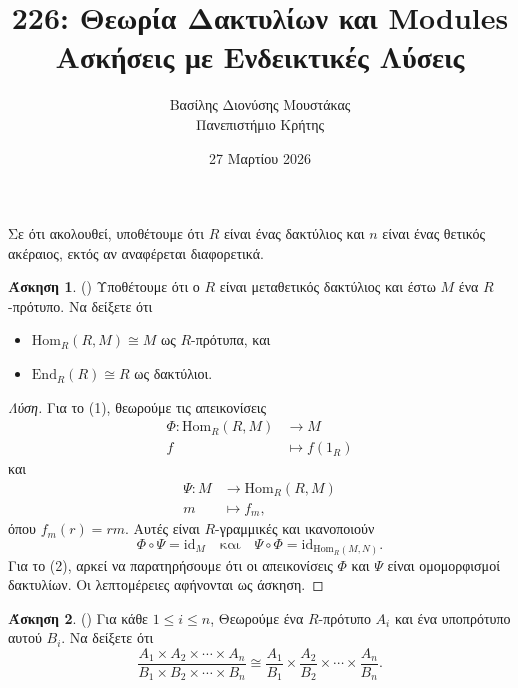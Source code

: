 \documentclass[12pt,a4paper,reqno]{amsart}
\title{226: Θεωρία Δακτυλίων και Modules \\ Ασκήσεις με Ενδεικτικές Λύσεις}
\author[Β.~Δ. Μουστακας]{Βασίλης Διονύσης Μουστάκας \\ Πανεπιστήμιο Κρήτης}
\date{27 Μαρτίου 2026}
\theoremstyle{definition}
\newtheorem{exercise}{Άσκηση}
\renewcommand{\to}{\rightarrow}
\newcommand{\End}{\mathrm{End}}
\newcommand{\rmid}{\mathrm{id}}
\newcommand{\Hom}{\mathrm{Hom}}
\begin{document}
\begingroup
\def\uppercasenonmath#1{} %
\let\MakeUppercase\relax %
\maketitle
\endgroup

\setcounter{exercise}{19}
\setcounter{equation}{3}
\renewcommand{\thesubsection}{\thesection.\arabic{subsection}}

Σε ότι ακολουθεί, υποθέτουμε ότι $R$ είναι ένας δακτύλιος και $n$ είναι ένας θετικός ακέραιος, εκτός αν αναφέρεται διαφορετικά.

\begin{exercise}{\rm(\cite[Ασκήσεις~10.2.9~και~10.2.10]{DF04})}
  \label{ex:DF_10.2.9_10.2.10}
  Υποθέτουμε ότι ο $R$ είναι μεταθετικός δακτύλιος και έστω $M$ ένα $R$-πρότυπο. Να δείξετε ότι 
  \begin{itemize}
    \item[(1)] $\Hom_R(R,M) \cong M$ ως $R$-πρότυπα, και 
    \item[(2)] $\End_R(R) \cong R$ ως δακτύλιοι.
  \end{itemize}
\end{exercise}

\begin{proof}[Λύση]
  Για το (1), θεωρούμε τις απεικονίσεις
  \begin{align*}
    \Phi : \Hom_R(R,M) &\to M \\
    f &\mapsto f(1_R)
  \end{align*}
  και
  \begin{align*}
    \Psi : M &\to \Hom_R(R,M) \\
            m &\mapsto f_m,
  \end{align*}
  όπου $f_m(r) = rm$. Αυτές είναι $R$-γραμμικές και ικανοποιούν 
  \[
  \Phi \circ \Psi = \rmid_M \quad \text{και} \quad 
  \Psi \circ \Phi = \rmid_{\Hom_R(M,N)}.
  \]
  Για το (2), αρκεί να παρατηρήσουμε ότι οι απεικονίσεις $\Phi$ και $\Psi$ είναι ομομορφισμοί δακτυλίων. Οι λεπτομέρειες αφήνονται ως άσκηση.
\end{proof}

\begin{exercise}{\rm(\cite[Άσκηση~10.2.11]{DF04})}
  \label{ex:DF_10.2.11}
  Για κάθε $1 \le i \le n$, Θεωρούμε ένα $R$-πρότυπο $A_i$ και ένα υποπρότυπο αυτού $B_i$. Να δείξετε ότι 
  \[
  \frac{A_1\times A_2 \times \cdots \times A_n}{B_1 \times B_2 \times \cdots \times B_n} \cong \frac{A_1}{B_1} \times \frac{A_2}{B_2} \times \cdots \times \frac{A_n}{B_n}.
  \]
\end{exercise}
\end{document}
